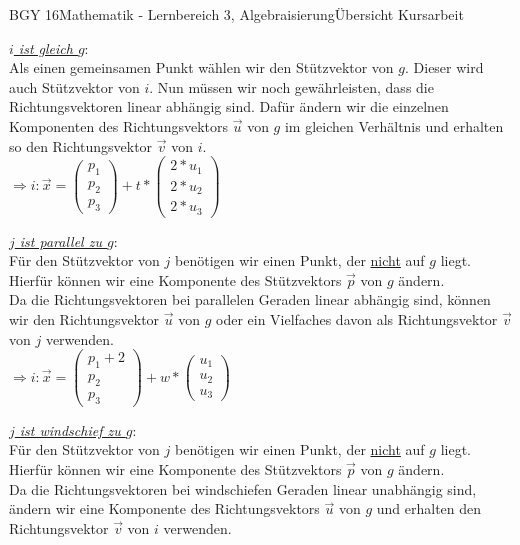 \documentclass[oneside,openany,headings=optiontotoc,11pt,numbers=noenddot]{scrreprt}
\begin{document}
\begin{worksheet}{BGY 16}{Mathematik - Lernbereich 3, Algebraisierung}{Übersicht Kursarbeit}
\begin{framed}
			\underline{\textit{\(i\) ist \color{codegreen}gleich\normalcolor{} \(g\)}}:\\
			Als einen gemeinsamen Punkt wählen wir den Stützvektor von \(g\). Dieser wird auch Stützvektor von \(i\). Nun müssen wir noch gewährleisten, dass die Richtungsvektoren linear \color{blue}abhängig\normalcolor{} sind. Dafür ändern wir die einzelnen Komponenten des Richtungsvektors \(\vec{u}\) von \(g\) im gleichen Verhältnis und erhalten so den Richtungsvektor \(\vec{v}\) von \(i\).\\
			\(\Rightarrow i: \vec{x} = \left(\begin{array}{c}p_1\\p_2\\p_3\end{array}\right) + t*\left(\begin{array}{c}2*u_1\\2*u_2\\2*u_3\end{array}\right)\)\\
			\par\bigskip\noindent
			\underline{\textit{\(j\) ist \color{red}parallel\normalcolor{} zu \(g\)}}:\\
			Für den Stützvektor von \(j\) benötigen wir einen Punkt, der \underline{nicht} auf \(g\) liegt. Hierfür können wir eine Komponente des Stützvektors \(\vec{p}\) von \(g\) ändern.\\ Da die Richtungsvektoren bei \color{red}parallelen\normalcolor{} Geraden linear \color{blue}abhängig\normalcolor{} sind, können wir den Richtungsvektor \(\vec{u}\) von \(g\) oder ein Vielfaches davon als Richtungsvektor \(\vec{v}\) von \(j\) verwenden.\\
			\(\Rightarrow i: \vec{x} = \left(\begin{array}{c}p_1+2\\p_2\\p_3\end{array}\right) + w*\left(\begin{array}{c}u_1\\u_2\\u_3\end{array}\right)\)\\
			\par\bigskip\noindent
			\underline{\textit{\(j\) ist \color{red}windschief\normalcolor{} zu \(g\)}}:\\
			Für den Stützvektor von \(j\) benötigen wir einen Punkt, der \underline{nicht} auf \(g\) liegt. Hierfür können wir eine Komponente des Stützvektors \(\vec{p}\) von \(g\) ändern.\\ Da die Richtungsvektoren bei \color{red}windschiefen\normalcolor{} Geraden linear \color{blue}unabhängig\normalcolor{} sind, ändern wir eine Komponente des Richtungsvektors \(\vec{u}\) von \(g\) und erhalten den Richtungsvektor \(\vec{v}\) von \(i\) verwenden.\\

\end{framed}
\end{worksheet}
\end{document}
